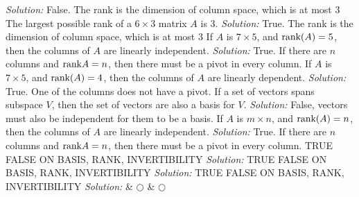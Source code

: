     \ifnum {} {\color{DarkBlue} \textit{Solution:  } False. 
    The rank is the dimension of column space, which is at most 3} \fi
\fi     
\ifnum {}
    The largest possible rank of a $6 \times 3$ matrix $A$ is $3$. 
    \ifnum {} {\color{DarkBlue} \textit{Solution:  } True. 
    The rank is the dimension of column space, which is at most 3}  \fi
\fi     
\ifnum {}
    If $A$ is $7\times 5$, and $\text{rank} (A) = 5$, then the columns of $A$ are linearly independent.
    \ifnum {} {\color{DarkBlue} \textit{Solution:  } True. If there are $n$ columns and $\text{rank} A = n$, then there must be a pivot in every column. }
    \fi
\fi     
\ifnum {}
    If $A$ is $7\times 5$, and $\text{rank} (A) = 4$, then the columns of $A$ are linearly dependent.
    \ifnum {} {\color{DarkBlue} \textit{Solution:  } True. One of the columns does not have a pivot.} \fi
\fi    
\ifnum {}
     If a set of vectors spans subspace $V$, then the set of vectors are also a basis for $V$.
    \ifnum {} {\color{DarkBlue} \textit{Solution:  } False, vectors must also be independent for them to be a basis. } \fi
\fi    
\ifnum {}
    If $A$ is $m\times n$, and $\text{rank} (A) = n$, then the columns of $A$ are linearly independent.
    \ifnum {} {\color{DarkBlue} \textit{Solution:  } True. If there are $n$ columns and $\text{rank} A = n$, then there must be a pivot in every column. } \fi
\fi    
\ifnum {}
    TRUE FALSE ON BASIS, RANK, INVERTIBILITY
    \ifnum {} {\color{DarkBlue} \textit{Solution:  } } \fi
\fi    
\ifnum {}
    TRUE FALSE ON BASIS, RANK, INVERTIBILITY
    \ifnum {} {\color{DarkBlue} \textit{Solution:  } } \fi
\fi    
\ifnum {}
    TRUE FALSE ON BASIS, RANK, INVERTIBILITY
    \ifnum {} {\color{DarkBlue} \textit{Solution:  } } \fi
\fi    
& $\bigcirc$  & $\bigcirc$ \\   

